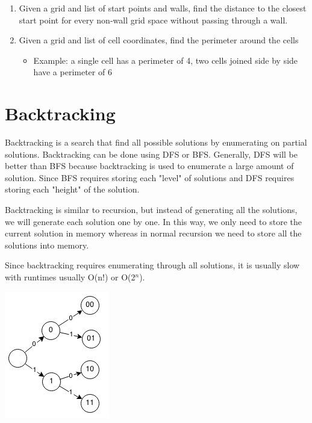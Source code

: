 \documentclass[11pt,oneside]{book}
\makeatletter
\def\maxwidth#1{\ifdim\Gin@nat@width>#1 #1\else\Gin@nat@width\fi}
\makeatother
\begin{document}
\begin{enumerate}
\item Given a grid and list of start points and walls, find the distance to the closest start point for every non-wall grid space without passing through a wall.
\item Given a grid and list of cell coordinates, find the perimeter around the cells

\begin{itemize}
\item Example: a single cell has a perimeter of 4, two cells joined side by side have a perimeter of 6
\end{itemize}
\end{enumerate}

        \section{ Backtracking }
        

Backtracking is a search that find all possible solutions by enumerating on partial solutions. Backtracking can be done using DFS or BFS. Generally, DFS will be better than BFS because backtracking is used to enumerate a large amount of solution. Since BFS requires storing each "level" of solutions and DFS requires storing each "height" of the solution.

Backtracking is similar to recursion, but instead of generating all the solutions, we will generate each solution one by one. In this way, we only need to store the current solution in memory whereas in normal recursion we need to store all the solutions into memory.

Since backtracking requires enumerating through all solutions, it is usually slow with runtimes usually O(n!) or O(2$^{n}$).

\vspace{5px}\includegraphics[width=\maxwidth{\textwidth}]{backtracking.png}
\end{document}
